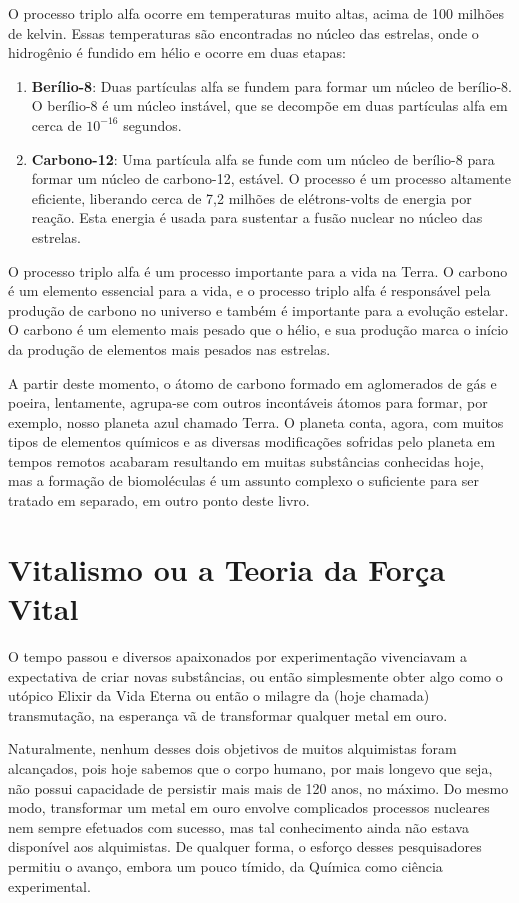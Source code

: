 \documentclass[a4paper,12pt]{book}
\begin{document}
O processo triplo alfa ocorre em temperaturas muito altas, acima de 100 milhões de kelvin. Essas temperaturas são encontradas no núcleo das estrelas, onde o hidrogênio é fundido em hélio e ocorre em duas etapas:

\begin{enumerate}
	\item \textbf{Berílio-8}: Duas partículas alfa se fundem para formar um núcleo de berílio-8. O berílio-8 é um núcleo instável, que se decompõe em duas partículas alfa em cerca de $10^{-16}$ segundos.
	\item \textbf{Carbono-12}: Uma partícula alfa se funde com um núcleo de berílio-8 para formar um núcleo de carbono-12, estável. O processo é um processo altamente eficiente, liberando cerca de 7,2 milhões de elétrons-volts de energia por reação. Esta energia é usada para sustentar a fusão nuclear no núcleo das estrelas.
\end{enumerate}

O processo triplo alfa é um processo importante para a vida na Terra. O carbono é um elemento essencial para a vida, e o processo triplo alfa é responsável pela produção de carbono no universo e também é importante para a evolução estelar. O carbono é um elemento mais pesado que o hélio, e sua produção marca o início da produção de elementos mais pesados nas estrelas.

A partir deste momento, o átomo de carbono formado em aglomerados de gás e poeira, lentamente, agrupa-se com outros incontáveis átomos para formar, por exemplo, nosso planeta azul chamado Terra. O planeta conta, agora, com muitos tipos de elementos químicos e as diversas modificações sofridas pelo planeta em tempos remotos acabaram resultando em muitas substâncias conhecidas hoje, mas a formação de biomoléculas é um assunto complexo o suficiente para ser tratado em separado, em outro ponto deste livro.

\chapter{Vitalismo ou a Teoria da Força Vital}
O tempo passou e diversos apaixonados por experimentação vivenciavam a expectativa de criar novas substâncias, ou então simplesmente obter algo como o utópico Elixir da Vida Eterna ou então o milagre da (hoje chamada) transmutação, na esperança vã de transformar qualquer metal em ouro. 

Naturalmente, nenhum desses dois objetivos de muitos alquimistas foram alcançados, pois hoje sabemos que o corpo humano, por mais longevo que seja, não possui capacidade de persistir mais mais de 120 anos, no máximo. Do mesmo modo, transformar um metal em ouro envolve complicados processos nucleares nem sempre efetuados com sucesso, mas tal conhecimento ainda não estava disponível aos alquimistas. De qualquer forma, o esforço desses pesquisadores permitiu o avanço, embora um pouco tímido, da Química como ciência experimental.
\end{document}
